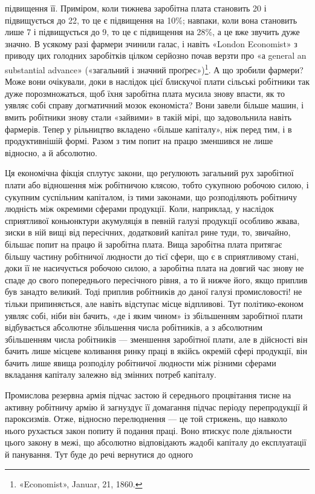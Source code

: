 \parcont{}  %
підвищення її. Приміром, коли тижнева заробітна плата становить
20 і підвищується до 22, то це є підвищення
на 10\%; навпаки, коли вона становить лише 7
і підвищується до 9, то це є підвищення на 28\%, а це вже
звучить дуже значно. В усякому разі фармери зчинили галас,
і навіть «London Economist» з приводу цих голодних заробітків
цілком серйозно почав верзти про «а general an substantial
advance» («загальний і значний проґрес»)\footnote{
«Economist», Januar, 21, 1860.
}. А що зробили
фармери? Може вони очікували, доки в наслідок цієї блискучої
плати сільські робітники так дуже порозмножаться, щоб їхня
заробітна плата мусила знову впасти, як то уявляє собі справу
догматичний мозок економіста? Вони завели більше машин,
і вмить робітники знову стали «зайвими» в такій мірі, що задовольнила
навіть фармерів. Тепер у рільництво вкладено
«більше капіталу», ніж перед тим, і в продуктивнішій формі.
Разом з тим попит на працю зменшився не лише відносно,
а й абсолютно.

Ця економічна фікція сплутує закони, що реґулюють загальний
рух заробітної плати або відношення між робітничою клясою,
тобто сукупною робочою силою, і сукупним суспільним капіталом,
із тими законами, що розподіляють робітничу людність
між окремими сферами продукції. Коли, наприклад, у наслідок
сприятливої коньюнктури акумуляція в певній галузі продукції
особливо жвава, зиски в ній вищі від пересічних, додатковий
капітал рине туди, то, звичайно, більшає попит на працю й заробітна
плата. Вища заробітна плата притягає більшу частину
робітничої людности до тієї сфери, що є в сприятливому стані,
доки її не насичується робочою силою, а заробітна плата на довгий
час знову не спаде до свого попереднього пересічного рівня,
а то й нижче його, якщо приплив був занадто великий. Тоді
приплив робітників до даної галузі промисловості! не тільки
припиняється, але навіть відступає місце відпливові. Тут політико-економ
уявляє собі, ніби він бачить, «де і яким чином»
із збільшенням заробітної плати відбувається абсолютне збільшення
числа робітників, а з абсолютним збільшенням числа робітників
— зменшення заробітної плати, але в дійсності він бачить
лише місцеве коливання ринку праці в якійсь окремій сфері
продукції, він бачить лише явища розподілу робітничої людности
між різними сферами вкладання капіталу залежно від змінних
потреб капіталу.

Промислова резервна армія підчас застою й середнього процвітання
тисне на активну робітничу армію й загнуздує її домагання
підчас періоду перепродукції й пароксизмів. Отже, відносно
перелюднення — це той стрижень, що навколо нього рухається
закон попиту й подання праці. Воно втискує поле діяльности
цього закону в межі, що абсолютно відповідають жадобі капіталу
до експлуатації й панування. Тут буде до речі вернутися до одного
\parbreak{}  %
